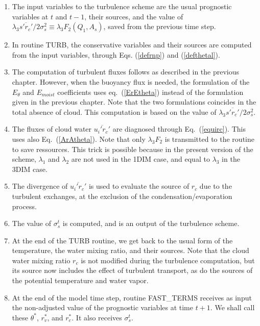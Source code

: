 \begin{enumerate}

\item The input variables to the turbulence scheme are the usual prognostic
variables at $t$ and $t-1$, their sources, and the value of $\lambda_3
\overline{s'r_c'} / 2 \sigma_s^2 \equiv \lambda_3 F_2(Q_1,A_s)$,
saved from the previous time step.

\item
In routine TURB, the conservative variables and their sources are computed
from the input variables, through Eqs. (\ref{defrnp}) and (\ref{defthetal}).

\item
The computation of turbulent fluxes follows as described in the previous
chapter. However, when the buoyancy flux is needed, the formulation of the
$E_{\theta}$ and $E_{moist}$ coefficients uses eq.~(\ref{ErEtheta})
instead of the formulation given in the previous chapter. Note that the
two formulations coincides in the total absence of cloud. This computation
is based on the value of $\lambda_3 \overline{s'r_c'}/2\sigma_s^2$.

\item
The fluxes of cloud water $\overline{u_i'r_c'}$ are diagnosed
through Eq.~(\ref{equirc}).
This uses also Eq.~(\ref{ArAtheta}). Note that only $\lambda_3 F_2$ is transmitted
to the routine to save ressources. This trick is possible because in the
present version of the scheme, $\lambda_1$ and $\lambda_2$ are not used
in the 1DIM case, and equal to $\lambda_3$ in the 3DIM case.

\item
The divergence of $\overline{u_i'r_c'}$ is used to evaluate the source
of $r_c$ due to the
turbulent exchanges, at the exclusion of the condensation/evaporation process.

\item The value of $\sigma_s^t$ is computed, and is an
output of the turbulence scheme.

\item
At the end of the TURB routine, we get back to the usual form of the
temperature, the water mixing ratio, and their sources. Note that the
cloud water mixing ratio $r_c$ is not modified during the turbulence
computation, but its source now includes the effect of turbulent transport,
as do the sources of the potential temperature and water vapor.


\item At the end of the model time step, routine FAST\_TERMS receives
as input the non-adjusted value of the prognostic variables at time $t+1$.
We shall call
these $\theta^*$, $r_v^*$, and $r_c^*$. It also receives $\sigma_s^t$.


\end{enumerate}

